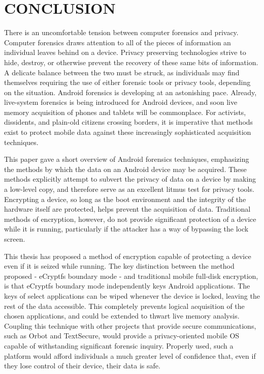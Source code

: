 \chapter{CONCLUSION}
There is an uncomfortable tension between computer forensics and privacy. Computer forensics draws attention to all of the pieces of
information an individual leaves behind on a device.  Privacy preserving technologies strive to hide, destroy, or otherwise prevent
the recovery of these same bits of information. A delicate balance between the two must be struck, as individuals may find
themselves requiring the use of either forensic tools or privacy tools, depending on the situation.  Android forensics is developing
at an astonishing pace.  Already, live-system forensics is being introduced for Android devices, and soon live memory acquisition of
phones and tablets will be commonplace. For activists, dissidents, and plain-old citizens crossing borders, it is imperative that
methods exist to protect mobile data against these increasingly sophisticated acquisition techniques.  

This paper gave a short overview of Android forensics techniques, emphasizing the methods by which the data on an Android device may
be acquired. These methods explicitly attempt to subvert the privacy of data on a device by making a low-level copy, and therefore
serve as an excellent litmus test for privacy tools. Encrypting a device, so long as the boot environment and the integrity of the
hardware itself are protected, helps prevent the acquisition of data. Traditional methods of encryption, however, do not provide
significant protection of a device while it is running, particularly if the attacker has a way of bypassing the lock screen.

This thesis has proposed a method of encryption capable of protecting a device even if it is seized while running.  The key
distinction between the method proposed - eCryptfs boundary mode - and traditional mobile full-disk encryption, is that eCryptfs
boundary mode independently keys Android applications. The keys of select applications can be wiped whenever the device is locked,
leaving the rest of the data accessible. This completely prevents logical acquisition of the chosen applications, and could be
extended to thwart live memory analysis. Coupling this technique with other projects that provide secure communications, such as
Orbot and TextSecure, would provide a privacy-oriented mobile OS capable of withstanding significant forensic inquiry. Properly
used, such a platform would afford individuals a much greater level of confidence that, even if they lose control of their device,
their data is safe.
